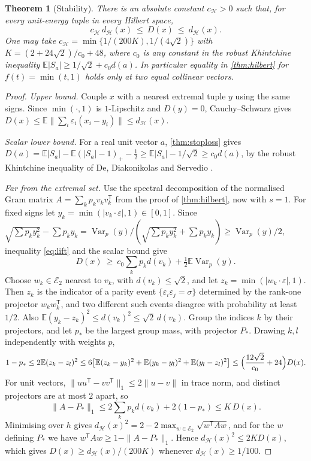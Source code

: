 \documentclass[11pt,a4paper]{article}
\numberwithin{equation}{section}
\newtheorem{theorem}{Theorem}[section]
\theoremstyle{remark}
\newcommand{\E}{\mathbb E}
\newcommand{\cH}{\mathcal H}
\newcommand{\Var}{\operatorname{Var}}
\begin{document}
\begin{theorem}[Stability]\label{thm:stability}
There is an absolute constant $c_\cH>0$ such that, for every unit-energy
tuple in every Hilbert space,
\[
 c_\cH\,d_\cH(x)\ \le\ D(x)\ \le\ d_\cH(x).
\]
One may take $c_\cH=\min\{1/(200K),1/(4\sqrt2)\}$ with
$K=(2+24\sqrt2)/c_0+48$, where $c_0$ is any constant in the robust
Khintchine inequality $\E|S_a|\ge1/\sqrt2+c_0d(a)$. In particular equality
in \cref{thm:hilbert} for $f(t)=\min(t,1)$ holds only at two equal
collinear vectors.
\end{theorem}

\begin{proof}
\emph{Upper bound.} Couple $x$ with a nearest extremal tuple $y$ using the
same signs. Since $\min(\cdot,1)$ is $1$-Lipschitz and $D(y)=0$, Cauchy--Schwarz
gives $D(x)\le\E\|\sum_i\varepsilon_i(x_i-y_i)\|\le d_\cH(x)$.

\emph{Scalar lower bound.} For a real unit vector $a$, \cref{thm:stoploss}
gives $D(a)=\E|S_a|-\E(|S_a|-1)_+-\tfrac12\ge\E|S_a|-1/\sqrt2\ge c_0d(a)$, by
the robust Khintchine inequality of De, Diakonikolas and Servedio
\cite[Theorem~9]{DDS}.

\emph{Far from the extremal set.} Use the spectral decomposition of the
normalised Gram matrix $A=\sum_kp_kv_kv_k^{\mathsf T}$ from the proof of
\cref{thm:hilbert}, now with $s=1$. For fixed signs let
$y_k=\min(|v_k\cdot\varepsilon|,1)\in[0,1]$. Since
$\sqrt{\sum p_ky_k^2}-\sum p_ky_k=\Var_p(y)/(\sqrt{\sum p_ky_k^2}+\sum p_ky_k)
\ge\Var_p(y)/2$, inequality \eqref{eq:lift} and the scalar bound give
\begin{equation}\label{eq:variance}
 D(x)\ \ge\ c_0\sum_kp_kd(v_k)+\tfrac12\E\Var_p(y).
\end{equation}
Choose $w_k\in\mathcal E_2$ nearest to $v_k$, with $d(v_k)\le\sqrt2$, and
let $z_k=\min(|w_k\cdot\varepsilon|,1)$. Then $z_k$ is the indicator of a
parity event $\{\varepsilon_i\varepsilon_j=\sigma\}$ determined by the
rank-one projector $w_kw_k^{\mathsf T}$, and two different such events
disagree with probability at least $1/2$. Also
$\E(y_k-z_k)^2\le d(v_k)^2\le\sqrt2\,d(v_k)$. Group the indices $k$ by
their projectors, and let $p_*$ be the largest group mass, with projector
$P_*$. Drawing $k,l$ independently with weights $p$,
\[
 1-p_*\le2\E(z_k-z_l)^2\le6\bigl[\E(z_k-y_k)^2+\E(y_k-y_l)^2+\E(y_l-z_l)^2\bigr]
 \le\Bigl(\frac{12\sqrt2}{c_0}+24\Bigr)D(x).
\]
For unit vectors, $\|uu^{\mathsf T}-vv^{\mathsf T}\|_1\le2\|u-v\|$ in trace
norm, and distinct projectors are at most $2$ apart, so
\begin{equation}\label{eq:gram}
 \|A-P_*\|_1\le2\sum_kp_kd(v_k)+2(1-p_*)\le K\,D(x).
\end{equation}
Minimising over $h$ gives
$d_\cH(x)^2=2-2\max_{w\in\mathcal E_2}\sqrt{w^{\mathsf T}Aw}$, and for the
$w$ defining $P_*$ we have $w^{\mathsf T}Aw\ge1-\|A-P_*\|_1$. Hence
$d_\cH(x)^2\le2KD(x)$, which gives $D(x)\ge d_\cH(x)/(200K)$ whenever
$d_\cH(x)\ge1/100$.


\end{proof}
\end{document}
